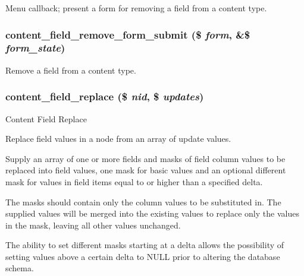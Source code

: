 Menu callback; present a form for removing a field from a content type. \hypertarget{content_8admin_8inc_f20e882fe0b838c602be760ccf857f2f}{
\subsubsection[{content\_\-field\_\-remove\_\-form\_\-submit}]{\setlength{\rightskip}{0pt plus 5cm}content\_\-field\_\-remove\_\-form\_\-submit (\$ {\em form}, \/  \&\$ {\em form\_\-state})}}
\label{content_8admin_8inc_f20e882fe0b838c602be760ccf857f2f}


Remove a field from a content type. \hypertarget{content_8admin_8inc_5dee1d4c64d47ed239224c9ec9a8b798}{
\subsubsection[{content\_\-field\_\-replace}]{\setlength{\rightskip}{0pt plus 5cm}content\_\-field\_\-replace (\$ {\em nid}, \/  \$ {\em updates})}}
\label{content_8admin_8inc_5dee1d4c64d47ed239224c9ec9a8b798}


Content Field Replace

Replace field values in a node from an array of update values.

Supply an array of one or more fields and masks of field column values to be replaced into field values, one mask for basic values and an optional different mask for values in field items equal to or higher than a specified delta.

The masks should contain only the column values to be substituted in. The supplied values will be merged into the existing values to replace only the values in the mask, leaving all other values unchanged.

The ability to set different masks starting at a delta allows the possibility of setting values above a certain delta to NULL prior to altering the database schema.

